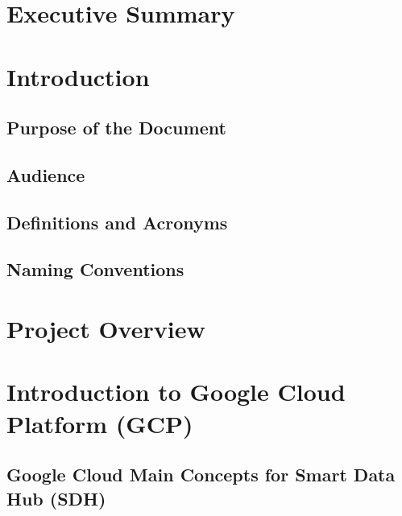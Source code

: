 \documentclass[12pt]{article}
\begin{document}
    \tableofcontents
    \newpage


    \section{Executive Summary}


    \section{Introduction}

    \subsection{Purpose of the Document}

    \subsection{Audience}

    \subsection{Definitions and Acronyms}

    \subsection{Naming Conventions}


    \section{Project Overview}


    \section{Introduction to Google Cloud Platform (GCP)}

    \subsection{Google Cloud Main Concepts for Smart Data Hub (SDH)}
\end{document}
